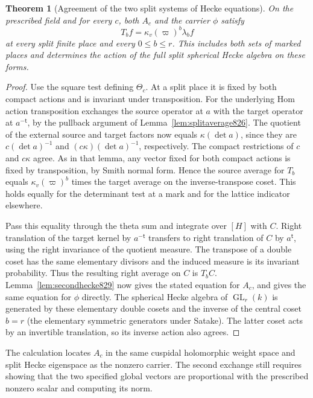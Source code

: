\documentclass[a4paper,11pt]{article}
\newtheorem{theorem}[proposition]{Theorem}
\theoremstyle{definition}
\theoremstyle{remark}
\numberwithin{equation}{section}
\begin{document}
\begin{theorem}[Agreement of the two split systems of Hecke equations]
\leavevmode\label{thm:secondcomparison829}
On the prescribed field and for every \(c\), both \(A_c\)
and the carrier \(\phi\) satisfy
\[
                    T_b f=\kappa_v(\varpi)^b\lambda_b f
\]
at every split finite place and every \(0\le b\le r\).
This includes both sets of marked places and determines the
action of the full split spherical Hecke algebra on these forms.
\end{theorem}
\begin{proof}
Use the square test defining \(\Theta_c\). At a split place
it is fixed by both compact actions and is invariant under
transposition. For the underlying Hom action transposition
exchanges the source operator at \(a\) with the target
operator at \(a^{-\mathsf t}\), by the pullback argument of
Lemma~\ref{lem:splitaverage826}. The quotient of the external
source and target factors now equals \(\kappa(\det a)\),
since they are \(c(\det a)^{-1}\) and
\((c\kappa)(\det a)^{-1}\), respectively. The compact
restrictions of \(c\) and \(c\kappa\) agree. As in that
lemma, any vector fixed for both compact actions is fixed
by transposition, by Smith normal form. Hence the source
average for \(T_b\) equals \(\kappa_v(\varpi)^b\) times
the target average on the inverse-transpose coset. This
holds equally for the determinant test at a mark and for
the lattice indicator elsewhere.

Pass this equality through the theta sum and integrate over
\([H]\) with \(C\). Right translation of the target kernel by
\(a^{-\mathsf t}\) transfers to right translation of \(C\)
by \(a^{\mathsf t}\), using the right invariance of the quotient
measure. The transpose of a double coset has the same
elementary divisors and the induced measure is its invariant
probability. Thus the resulting right average on \(C\) is
\(T_b C\). Lemma~\ref{lem:secondhecke829} now gives the stated
equation for \(A_c\), and gives the same equation for \(\phi\)
directly. The spherical Hecke algebra of
\(\operatorname{GL}_r(k)\) is generated by these elementary
double cosets and the inverse of the central coset \(b=r\)
(the elementary symmetric generators under Satake). The latter
coset acts by an invertible translation, so its inverse action
also agrees.
\end{proof}

The calculation locates \(A_c\) in the same cuspidal
holomorphic weight space and split Hecke eigenspace as the
nonzero carrier. The second exchange still requires showing
that the two specified global vectors are proportional with
the prescribed nonzero scalar and computing its norm.
\clearpage
\end{document}

